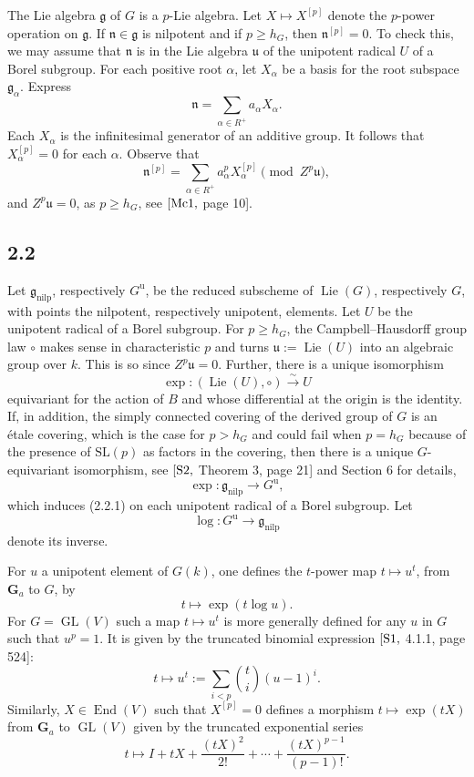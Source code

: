 \documentclass[11pt]{article}
\newcommand{\Ga}{\mathbf G_a}
\newcommand{\Lie}{\operatorname{Lie}}
\newcommand{\GL}{\operatorname{GL}}
\newcommand{\nilp}{\mathrm{nilp}}
\newcommand{\unip}{\mathrm u}
\begin{document}
The Lie algebra \(\mathfrak g\) of \(G\) is a \(p\)-Lie algebra. Let
\(X\mapsto X^{[p]}\) denote the \(p\)-power operation on \(\mathfrak g\). If
\(\mathfrak n\in\mathfrak g\) is nilpotent and if \(p\ge h_G\), then
\(\mathfrak n^{[p]}=0\). To check this, we may assume that \(\mathfrak n\) is in the
Lie algebra \(\mathfrak u\) of the unipotent radical \(U\) of a Borel subgroup. For each
positive root \(\alpha\), let \(X_\alpha\) be a basis for the root subspace
\(\mathfrak g_\alpha\). Express
\[
  \mathfrak n=\sum_{\alpha\in R^+} a_\alpha X_\alpha .
\]
Each \(X_\alpha\) is the infinitesimal generator of an additive group. It follows that
\(X_\alpha^{[p]}=0\) for each \(\alpha\). Observe that
\[
  \mathfrak n^{[p]}
  =\sum_{\alpha\in R^+} a_\alpha^{p}X_\alpha^{[p]}
    \pmod{Z^p\mathfrak u}, \tag{2.1.3}
\]
and \(Z^p\mathfrak u=0\), as \(p\ge h_G\), see \([{\rm Mc1},\) page 10].

\subsection*{2.2}

Let \(\mathfrak g_{\nilp}\), respectively \(G^{\unip}\), be the reduced subscheme of
\(\Lie(G)\), respectively \(G\), with points the nilpotent, respectively unipotent,
elements. Let \(U\) be the unipotent radical of a Borel subgroup. For \(p\ge h_G\),
the Campbell--Hausdorff group law \(\circ\) makes sense in characteristic \(p\) and
turns \(\mathfrak u:=\Lie(U)\) into an algebraic group over \(k\). This is so since
\(Z^p\mathfrak u=0\). Further, there is a unique isomorphism
\[
  \exp:(\Lie(U),\circ)\xrightarrow{\sim} U \tag{2.2.1}
\]
equivariant for the action of \(B\) and whose differential at the origin is the identity.
If, in addition, the simply connected covering of the derived group of \(G\) is an étale
covering, which is the case for \(p>h_G\) and could fail when \(p=h_G\) because of the
presence of \(\mathrm{SL}(p)\) as factors in the covering, then there is a unique
\(G\)-equivariant isomorphism, see \([{\rm S2},\) Theorem 3, page 21] and Section 6
for details,
\[
  \exp:\mathfrak g_{\nilp}\longrightarrow G^{\unip}, \tag{2.2.2}
\]
which induces (2.2.1) on each unipotent radical of a Borel subgroup. Let
\[
  \log:G^{\unip}\longrightarrow \mathfrak g_{\nilp}
\]
denote its inverse.

For \(u\) a unipotent element of \(G(k)\), one defines the \(t\)-power map
\(t\mapsto u^t\), from \(\Ga\) to \(G\), by
\[
  t\longmapsto \exp(t\log u). \tag{2.2.3}
\]
For \(G=\GL(V)\) such a map \(t\mapsto u^t\) is more generally defined for any
\(u\) in \(G\) such that \(u^p=1\). It is given by the truncated binomial expression
\([{\rm S1},\) 4.1.1, page 524]:
\[
  t\longmapsto u^t:=\sum_{i<p}\binom{t}{i}(u-1)^i. \tag{2.2.4}
\]
Similarly, \(X\in\operatorname{End}(V)\) such that \(X^{[p]}=0\) defines a morphism
\(t\mapsto \exp(tX)\) from \(\Ga\) to \(\GL(V)\) given by the truncated exponential
series
\[
  t\longmapsto I+tX+\frac{(tX)^2}{2!}+\cdots+
  \frac{(tX)^{p-1}}{(p-1)!}. \tag{2.2.5}
\]
\end{document}
